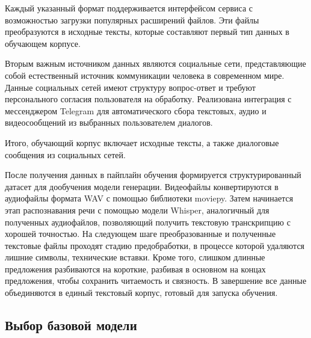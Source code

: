 Каждый указанный формат поддерживается интерфейсом сервиса с возможностью загрузки популярных расширений файлов. Эти файлы преобразуются в исходные тексты, которые составляют первый тип данных в обучающем корпусе.

Вторым важным источником данных являются социальные сети, представляющие собой естественный источник коммуникации человека в современном мире. Данные социальных сетей имеют структуру вопрос-ответ и требуют персонального согласия пользователя на обработку. Реализована интеграция с мессенджером Telegram для автоматического сбора текстовых, аудио и видеосообщений из выбранных пользователем диалогов.

Итого, обучающий корпус включает исходные тексты, а также диалоговые сообщения из социальных сетей.

После получения данных в пайплайн обучения формируется структурированный датасет для дообучения модели генерации. Видеофайлы конвертируются в аудиофайлы формата WAV с помощью библиотеки moviepy. Затем начинается этап распознавания речи с помощью модели Whisper, аналогичный для полученных аудиофайлов, позволяющий получить текстовую транскрипцию с хорошей точностью.
На следующем шаге преобразованные и полученные текстовые файлы проходят стадию предобработки, в процессе которой удаляются лишние символы, технические вставки. Кроме того, слишком длинные предложения разбиваются на короткие, разбивая в основном на концах предложения, чтобы сохранить читаемость и связность.
В завершение все данные объединяются в единый текстовый корпус, готовый для запуска обучения.


\subsection{Выбор базовой модели}

